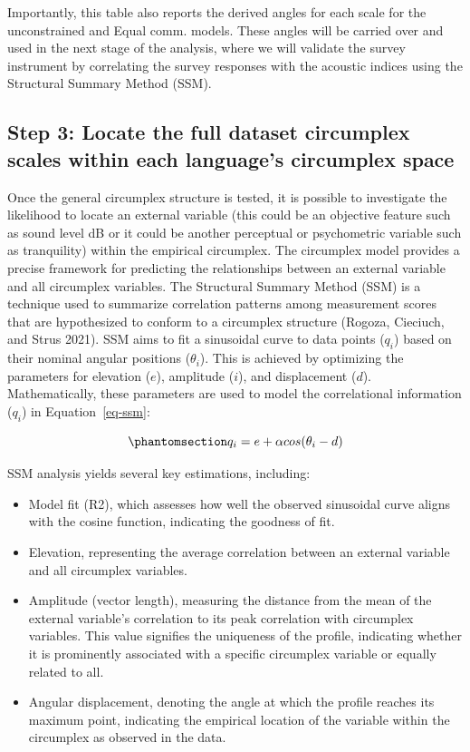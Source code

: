 \documentclass[
  default,
]{sn-jnl}
\providecommand{\tightlist}{%
  \setlength{\itemsep}{0pt}\setlength{\parskip}{0pt}}
\begin{document}
Importantly, this table also reports the derived angles for each scale
for the unconstrained and Equal comm. models. These angles will be
carried over and used in the next stage of the analysis, where we will
validate the survey instrument by correlating the survey responses with
the acoustic indices using the Structural Summary Method (SSM).

\subsection{Step 3: Locate the full dataset circumplex scales within
each language's circumplex
space}\label{step-3-locate-the-full-dataset-circumplex-scales-within-each-languages-circumplex-space}

Once the general circumplex structure is tested, it is possible to
investigate the likelihood to locate an external variable (this could be
an objective feature such as sound level dB or it could be another
perceptual or psychometric variable such as tranquility) within the
empirical circumplex. The circumplex model provides a precise framework
for predicting the relationships between an external variable and all
circumplex variables. The Structural Summary Method (SSM) is a technique
used to summarize correlation patterns among measurement scores that are
hypothesized to conform to a circumplex structure (Rogoza, Cieciuch, and
Strus 2021). SSM aims to fit a sinusoidal curve to data points (\(q_i\))
based on their nominal angular positions (\(\theta_i\)). This is
achieved by optimizing the parameters for elevation (\(e\)), amplitude
(\(i\)), and displacement (\(d\)). Mathematically, these parameters are
used to model the correlational information (\(q_i\)) in
Equation~\ref{eq-ssm}:

\begin{equation}\phantomsection\label{eq-ssm}{
q_i = e + \alpha cos(\theta_i - d)
}\end{equation}

SSM analysis yields several key estimations, including:

\begin{itemize}
\tightlist
\item
  Model fit (R2), which assesses how well the observed sinusoidal curve
  aligns with the cosine function, indicating the goodness of fit.
\item
  Elevation, representing the average correlation between an external
  variable and all circumplex variables.
\item
  Amplitude (vector length), measuring the distance from the mean of the
  external variable's correlation to its peak correlation with
  circumplex variables. This value signifies the uniqueness of the
  profile, indicating whether it is prominently associated with a
  specific circumplex variable or equally related to all.
\item
  Angular displacement, denoting the angle at which the profile reaches
  its maximum point, indicating the empirical location of the variable
  within the circumplex as observed in the data.
\end{itemize}
\end{document}
